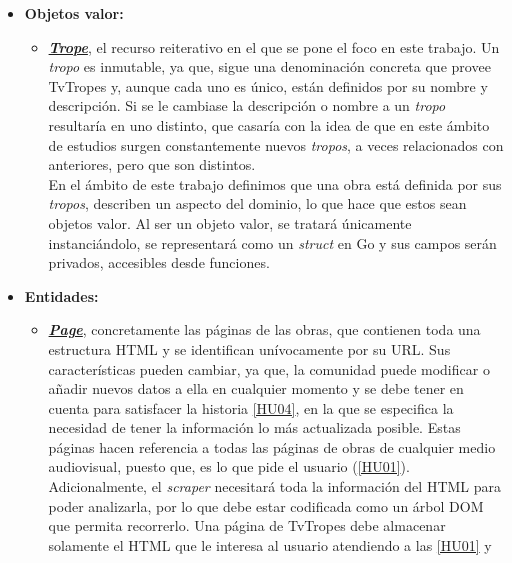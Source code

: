 \begin{itemize}
  \item \textbf{Objetos valor:}
  \begin{itemize}
    \item
    \textbf{\href{https://github.com/jlgallego99/TropesToGo/blob/master/tropestogo/trope.go}{\textit{Trope}}},
    el recurso reiterativo en el que se pone el foco en este trabajo. Un
    \textit{tropo} es inmutable, ya que, sigue una denominación concreta que
    provee TvTropes y, aunque cada uno es único, están definidos por su nombre y
    descripción. Si se le cambiase la descripción o nombre a un \textit{tropo}
    resultaría en uno distinto, que casaría con la idea de que en este ámbito de
    estudios surgen constantemente nuevos \textit{tropos}, a veces relacionados
    con anteriores, pero que son distintos.\\
    En el ámbito de este trabajo definimos que una obra está definida por sus
    \textit{tropos}, describen un aspecto del dominio, lo que hace que estos
    sean objetos valor. Al ser un objeto valor, se tratará únicamente
    instanciándolo, se representará como un \textit{struct} en Go y sus campos
    serán privados, accesibles desde funciones. 
  \end{itemize}
  \item \textbf{Entidades:}
  \begin{itemize}
    \item
    \textbf{\href{https://github.com/jlgallego99/TropesToGo/blob/master/tropestogo/page.go}{\textit{Page}}},
    concretamente las páginas de las obras, que contienen toda una estructura
    HTML y se identifican unívocamente por su URL. Sus características pueden
    cambiar, ya que, la comunidad puede modificar o añadir nuevos datos a ella
    en cualquier momento y se debe tener en cuenta para satisfacer la historia
    \href{https://github.com/jlgallego99/TropesToGo/issues/9}{[HU04]}, en la que
    se especifica la necesidad de tener la información lo más actualizada
    posible. Estas páginas hacen referencia a todas las páginas de obras de
    cualquier medio audiovisual, puesto que, es lo que pide el usuario
    (\href{https://github.com/jlgallego99/TropesToGo/issues/6}{[HU01]}).
    Adicionalmente, el \textit{scraper} necesitará toda la información del HTML
    para poder analizarla, por lo que debe estar codificada como un árbol DOM
    que permita recorrerlo. Una página de TvTropes debe almacenar solamente el
    HTML que le interesa al usuario atendiendo a las
    \href{https://github.com/jlgallego99/TropesToGo/issues/6}{[HU01]} y

\end{itemize}
\end{itemize}
